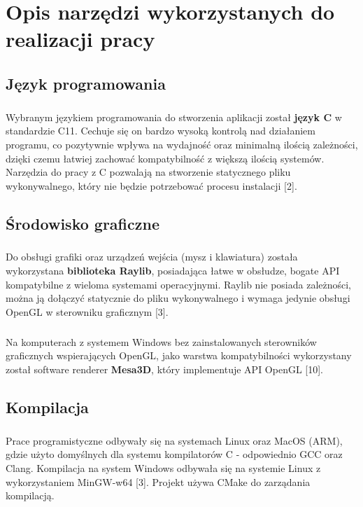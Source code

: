 \documentclass[12pt]{report}
\begin{document}
	
	\chapter{Opis narzędzi wykorzystanych do realizacji pracy}
	\section{Język programowania}
	\paragraph{}
	Wybranym językiem programowania do stworzenia aplikacji został \textbf{język C} w standardzie C11. Cechuje się on bardzo wysoką kontrolą nad działaniem programu, co pozytywnie wpływa na wydajność oraz minimalną ilością zależności, dzięki czemu łatwiej zachować kompatybilność z większą ilością systemów. Narzędzia do pracy z C pozwalają na stworzenie statycznego pliku wykonywalnego, który nie będzie potrzebować procesu instalacji [2].
	
	\section{Środowisko graficzne}
	\paragraph{}
	Do obsługi grafiki oraz urządzeń wejścia (mysz i klawiatura) została wykorzystana \textbf{biblioteka Raylib}, posiadająca łatwe w obsłudze, bogate API kompatybilne z wieloma systemami operacyjnymi. Raylib nie posiada zależności, można ją dołączyć statycznie do pliku wykonywalnego i wymaga jedynie obsługi OpenGL w sterowniku graficznym [3].
	\paragraph{}
	Na komputerach z systemem Windows bez zainstalowanych sterowników graficznych wspierających OpenGL, jako warstwa kompatybilności wykorzystany został software renderer \textbf{Mesa3D}, który implementuje API OpenGL [10].
	
	\section{Kompilacja}
	\paragraph{}
	Prace programistyczne odbywały się na systemach Linux oraz MacOS (ARM), gdzie użyto domyślnych dla systemu kompilatorów C - odpowiednio GCC oraz Clang. Kompilacja na system Windows odbywała się na systemie Linux z wykorzystaniem MinGW-w64 [3]. Projekt używa CMake do zarządania kompilacją.
	
\end{document}
